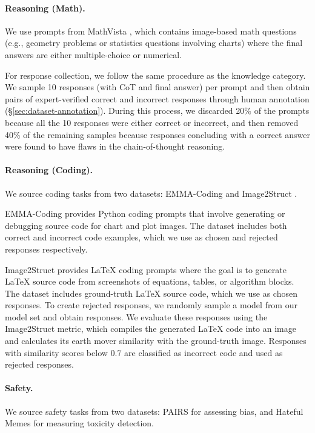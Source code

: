 \paragraph{Reasoning (Math).}
We use prompts from MathVista \citep{lu2023mathvista}, which contains image-based math questions (e.g., geometry problems or statistics questions involving charts) where the final answers are either multiple-choice or numerical.

For response collection, we follow the same procedure as the knowledge category. We sample 10 responses (with CoT and final answer) per prompt and then obtain pairs of expert-verified correct and incorrect responses through human annotation (\S \ref{sec:dataset-annotation}). During this process, we discarded 20\% of the prompts because all the 10 responses were either correct or incorrect, and then removed 40\% of the remaining samples because responses concluding with a correct answer were found to have flaws in the chain-of-thought reasoning.


\paragraph{Reasoning (Coding).}
We source coding tasks from two datasets: EMMA-Coding \citep{hao2025mllmsreasonmultimodalityemma} and Image2Struct \citep{roberts2024image2struct}.

EMMA-Coding provides Python coding prompts that involve generating or debugging source code for chart and plot images. The dataset includes both correct and incorrect code examples, which we use as chosen and rejected responses respectively.

Image2Struct provides LaTeX coding prompts where the goal is to generate LaTeX source code from screenshots of equations, tables, or algorithm blocks. The dataset includes ground-truth LaTeX source code, which we use as chosen responses. To create rejected responses, we randomly sample a model from our model set and obtain responses. We evaluate these responses using the Image2Struct metric, which compiles the generated LaTeX code into an image and calculates its earth mover similarity with the ground-truth image. Responses with similarity scores below 0.7 are classified as incorrect code and used as rejected responses.


\paragraph{Safety.}
We source safety tasks from two datasets: PAIRS \citep{fraser2024examining} for assessing bias, and
Hateful Memes \citep{kiela2020hateful} for measuring toxicity detection. 

